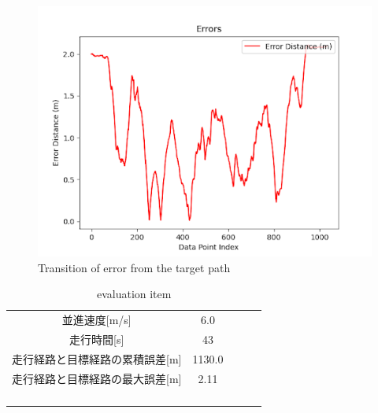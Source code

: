\begin{figure}[H]
     \centering
    \includegraphics[keepaspectratio, scale=0.7]
         {images/6mserror.png}
    \caption{Transition of error from the target path}
    \label{fig:path}
\end{figure}

\begin{table}[H]
     \centering
     \caption{evaluation item}
     \begin{tabular}{cclll}
     \multicolumn{1}{c|}{並進速度{[}m/s{]}}         & 6.0  &  &  &  \\
     \multicolumn{1}{c|}{走行時間{[}s{]}}           & 43   &  &  &  \\
     \multicolumn{1}{c|}{走行経路と目標経路の累積誤差{[}m{]}} & 1130.0 &  &  &  \\
     \multicolumn{1}{c|}{走行経路と目標経路の最大誤差{[}m{]}} & 2.11 &  &  &  \\
                                                &      &  &  &  \\
                                                &      &  &  &  \\
     \multicolumn{1}{l}{}                       &      &  &  &  \\
     \multicolumn{1}{l}{}                       &      &  &  & 
     \end{tabular}
\end{table}